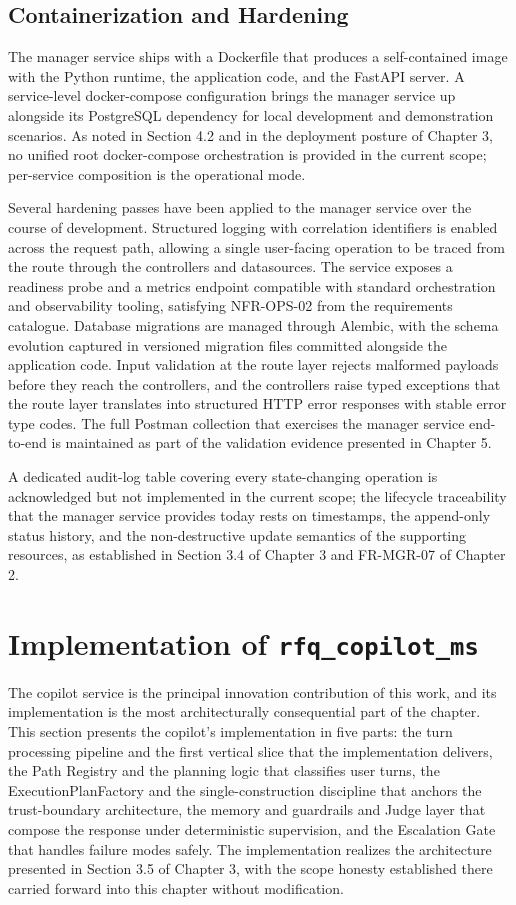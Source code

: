 \subsection{Containerization and Hardening}
The manager service ships with a Dockerfile that produces a self-contained image with the Python runtime, the application code, and the FastAPI server. A service-level docker-compose configuration brings the manager service up alongside its PostgreSQL dependency for local development and demonstration scenarios. As noted in Section 4.2 and in the deployment posture of Chapter 3, no unified root docker-compose orchestration is provided in the current scope; per-service composition is the operational mode.

Several hardening passes have been applied to the manager service over the course of development. Structured logging with correlation identifiers is enabled across the request path, allowing a single user-facing operation to be traced from the route through the controllers and datasources. The service exposes a readiness probe and a metrics endpoint compatible with standard orchestration and observability tooling, satisfying NFR-OPS-02 from the requirements catalogue. Database migrations are managed through Alembic, with the schema evolution captured in versioned migration files committed alongside the application code. Input validation at the route layer rejects malformed payloads before they reach the controllers, and the controllers raise typed exceptions that the route layer translates into structured HTTP error responses with stable error type codes. The full Postman collection that exercises the manager service end-to-end is maintained as part of the validation evidence presented in Chapter 5.

A dedicated audit-log table covering every state-changing operation is acknowledged but not implemented in the current scope; the lifecycle traceability that the manager service provides today rests on timestamps, the append-only status history, and the non-destructive update semantics of the supporting resources, as established in Section 3.4 of Chapter 3 and FR-MGR-07 of Chapter 2.

\section{Implementation of \texttt{rfq\_copilot\_ms}}
The copilot service is the principal innovation contribution of this work, and its implementation is the most architecturally consequential part of the chapter. This section presents the copilot's implementation in five parts: the turn processing pipeline and the first vertical slice that the implementation delivers, the Path Registry and the planning logic that classifies user turns, the ExecutionPlanFactory and the single-construction discipline that anchors the trust-boundary architecture, the memory and guardrails and Judge layer that compose the response under deterministic supervision, and the Escalation Gate that handles failure modes safely. The implementation realizes the architecture presented in Section 3.5 of Chapter 3, with the scope honesty established there carried forward into this chapter without modification.


